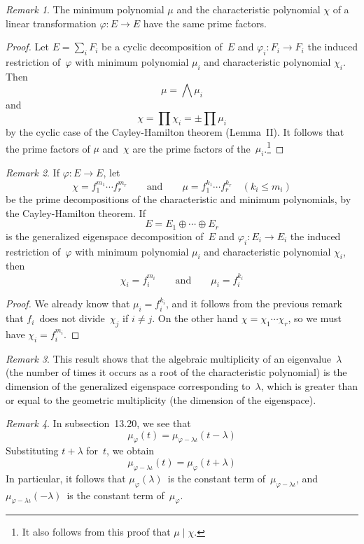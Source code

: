 \documentclass[letterpaper,12pt]{article}
\newcommand{\divides}{\mid}
\newcommand{\bigmeet}{\bigwedge}
\newcommand{\dsum}{\oplus}
\newcommand{\multi}[4]{#2_{#3}#1\cdots#1#2_{#4}}
\newcommand{\dsums}[3]{\multi{\dsum}{#1}{#2}{#3}}
\theoremstyle{definition}
\theoremstyle{remark}
\newtheorem*{rmk}{Remark}
\begin{document}
\begin{rmk}
The minimum polynomial \(\mu\) and the characteristic polynomial \(\chi\) of a linear transformation \(\varphi:E\to E\) have the same prime factors.
\end{rmk}
\begin{proof}
Let \(E=\sum_i F_i\) be a cyclic decomposition of~\(E\) and \(\varphi_i:F_i\to F_i\) the induced restriction of~\(\varphi\) with minimum polynomial \(\mu_i\) and characteristic polynomial \(\chi_i\). Then
\[\mu=\bigmeet\mu_i\]
and
\[\chi=\prod\chi_i=\pm\prod\mu_i\]
by the cyclic case of the Cayley-Hamilton theorem (Lemma~II). It follows that the prime factors of \(\mu\) and~\(\chi\) are the prime factors of the~\(\mu_i\).\footnote{It also follows from this proof that \(\mu\divides\chi\).}
\end{proof}

\begin{rmk}
If \(\varphi:E\to E\), let
\[\chi=f_1^{m_1}\cdots f_r^{m_r}\qquad\text{and}\qquad\mu=f_1^{k_1}\cdots f_r^{k_r}\quad(k_i\le m_i)\]
be the prime decompositions of the characteristic and minimum polynomials, by the Cayley-Hamilton theorem. If
\[E=\dsums{E}{1}{r}\]
is the generalized eigenspace decomposition of~\(E\) and \(\varphi_i:E_i\to E_i\) the induced restriction of~\(\varphi\) with minimum polynomial \(\mu_i\) and characteristic polynomial \(\chi_i\), then
\[\chi_i=f_i^{m_i}\qquad\text{and}\qquad\mu_i=f_i^{k_i}\]
\end{rmk}
\begin{proof}
We already know that \(\mu_i=f_i^{k_i}\), and it follows from the previous remark that \(f_i\)~does not divide~\(\chi_j\) if \(i\ne j\). On the other hand \(\chi=\chi_1\cdots\chi_r\), so we must have \(\chi_i=f_i^{m_i}\).
\end{proof}
\begin{rmk}
This result shows that the algebraic multiplicity of an eigenvalue~\(\lambda\) (the number of times it occurs as a root of the characteristic polynomial) is the dimension of the generalized eigenspace corresponding to~\(\lambda\), which is greater than or equal to the geometric multiplicity (the dimension of the eigenspace).
\end{rmk}

\begin{rmk}
In subsection~13.20, we see that
\[\mu_{\varphi}(t)=\mu_{\varphi-\lambda\iota}(t-\lambda)\]
Substituting \(t+\lambda\) for~\(t\), we obtain
\[\mu_{\varphi-\lambda\iota}(t)=\mu_{\varphi}(t+\lambda)\]
In particular, it follows that \(\mu_{\varphi}(\lambda)\)~is the constant term of~\(\mu_{\varphi-\lambda\iota}\), and \(\mu_{\varphi-\lambda\iota}(-\lambda)\)~is the constant term of~\(\mu_{\varphi}\).
\end{rmk}
\end{document}

